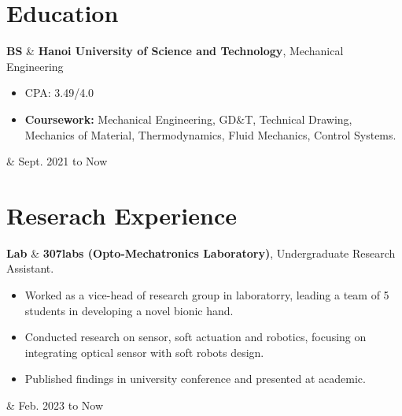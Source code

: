 \documentclass[10pt, letterpaper]{article}
\newenvironment{highlights}{
        \begin{itemize}[
                topsep=0pt,
                parsep=0.10 cm,
                partopsep=0pt,
                itemsep=0pt,
                after=\vspace{-1\baselineskip},
                leftmargin=0.4 cm + 3pt
            ]
    }{
        \end{itemize}
    } %
\let\originalTabularx\tabularx
\let\originalEndTabularx\endtabularx
\renewenvironment{tabularx}{\bgroup\centering\originalTabularx}{\originalEndTabularx\par\egroup}
\begin{document}
    \section{Education}
        \begin{tabularx}{
            \textwidth-0.4 cm-0.13cm
        }{
            L{0.85cm}
            K{0.2 cm}
            R{4.1 cm}
        }
            \textbf{BS}
            &
            \textbf{Hanoi University of Science and Technology}, Mechanical Engineering

            \vspace{0.10 cm}

            \begin{highlights}
                \item CPA: 3.49/4.0
                \item \textbf{Coursework:} Mechanical Engineering, GD\&T, Technical Drawing, Mechanics of Material, Thermodynamics, Fluid Mechanics, Control Systems.
            \end{highlights}
            &
            Sept. 2021 to Now
        \end{tabularx}

    \section{Reserach Experience}
        \begin{tabularx}{
            \textwidth-0.4 cm-0.13cm
        }{
            L{0.85cm}
            K{0.2 cm}
            R{4.1 cm}
        }
            \textbf{Lab}
            &
            \textbf{307labs (Opto-Mechatronics Laboratory)}, Undergraduate Research Assistant.

            \vspace{0.10 cm}

            \begin{highlights}
                \item Worked as a vice-head of research group in laboratorry, leading a team of 5 students in developing a novel bionic hand.
                \item Conducted research on sensor, soft actuation and robotics, focusing on integrating optical sensor with soft robots design.
                \item Published findings in university conference and presented at academic.
            \end{highlights}
            &
            Feb. 2023 to Now
        \end{tabularx}
\end{document}
